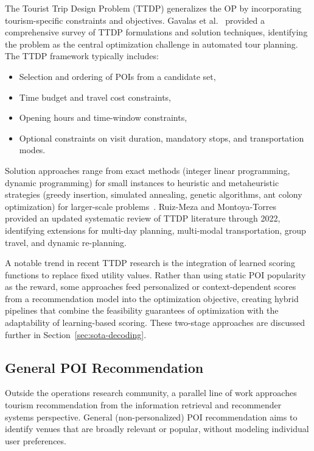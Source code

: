 The Tourist Trip Design Problem (TTDP) generalizes the OP by incorporating tourism-specific constraints and objectives. Gavalas et al.~\cite{gavalas2014ttdp} provided a comprehensive survey of TTDP formulations and solution techniques, identifying the problem as the central optimization challenge in automated tour planning. The TTDP framework typically includes:

\begin{itemize}
  \item Selection and ordering of POIs from a candidate set,
  \item Time budget and travel cost constraints,
  \item Opening hours and time-window constraints,
  \item Optional constraints on visit duration, mandatory stops, and transportation modes.
\end{itemize}

Solution approaches range from exact methods (integer linear programming, dynamic programming) for small instances to heuristic and metaheuristic strategies (greedy insertion, simulated annealing, genetic algorithms, ant colony optimization) for larger-scale problems~\cite{gavalas2014ttdp, ruizmeza2022ttdp}. Ruiz-Meza and Montoya-Torres~\cite{ruizmeza2022ttdp} provided an updated systematic review of TTDP literature through 2022, identifying extensions for multi-day planning, multi-modal transportation, group travel, and dynamic re-planning.

A notable trend in recent TTDP research is the integration of learned scoring functions to replace fixed utility values. Rather than using static POI popularity as the reward, some approaches feed personalized or context-dependent scores from a recommendation model into the optimization objective, creating hybrid pipelines that combine the feasibility guarantees of optimization with the adaptability of learning-based scoring. These two-stage approaches are discussed further in Section~\ref{sec:sota-decoding}.

\subsection{General POI Recommendation}
\label{sec:sota-nonpers-poi}

Outside the operations research community, a parallel line of work approaches tourism recommendation from the information retrieval and recommender systems perspective. General (non-personalized) POI recommendation aims to identify venues that are broadly relevant or popular, without modeling individual user preferences.

